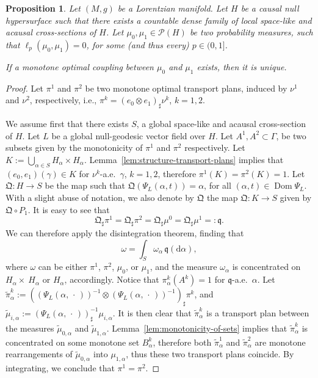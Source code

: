 \documentclass[12pt,a4paper]{amsart}
\theoremstyle{plain}
\newtheorem{proposition}[lemma]{Proposition}
\theoremstyle{definition}
\numberwithin{equation}{section}
\DeclareMathOperator{\dom}{Dom}
\newcommand{\de}{{\mathrm{d}}}
\newcommand{\Prob}{\mathcal P}
\newcommand{\dotargument}{\,\cdot\,}
\newcommand{\q}{\mathfrak{q}}
\newcommand{\QQ}{\mathfrak Q}
\newcommand{\gflow}{\Psi}
\begin{document}
\begin{proposition}
  \label{P:uniqueness-monotone}
Let $(M,g)$ be a Lorentzian manifold.
  Let $H$ be a causal null hypersurface such that there exists a countable
  dense family of local
  space-like and acausal cross-sections of $H$. 
  Let $\mu_0,\mu_1\in \Prob(H)$ be two probability measures, such that
  $\ell_p(\mu_0,\mu_1)=0$,  for some (and thus every) $p\in (0,1]$.

  If a monotone optimal coupling between $\mu_0$ and $\mu_1$
  exists, then it is unique.
\end{proposition}
\begin{proof}
  Let $\pi^1$ and $\pi^2$ be two monotone optimal transport plans, induced by
  $\nu^1$ and $\nu^2$, respectively, i.e., $\pi^k=(e_0\otimes
  e_1)_{\sharp} \nu^k$, $k=1,2$.

  We assume first that there exists $S$, a global space-like and
  acausal cross-section of $H$.
  Let $L$ be a global null-geodesic vector field over $H$.
  Let $A^1,A^2\subset\Gamma$, be two subsets given by the monotonicity
  of $\pi^1$ and $\pi^2$ respectively.
  Let $K:=\bigcup_{\alpha\in S} H_\alpha\times H_\alpha$.
  Lemma~\ref{lem:structure-transport-plans} implies that
  $(e_0,e_1)(\gamma)\in K$ for $\nu^k$-a.e.\ $\gamma$, $k=1,2$,
  therefore $\pi^1(K)=\pi^2(K)=1$.
  Let $\QQ:H\to S$ be the map such that $\QQ(\gflow_L(\alpha,t))=\alpha$, for
  all $(\alpha,t)\in\dom \gflow_L$.
  With a slight abuse of notation, we also denote by $\QQ$ the map $\QQ:  K \to
  S$ given by $\QQ\circ P_1$.
  It is easy to see that
  \begin{equation}
    \QQ_{\sharp}\pi^1
    =
    \QQ_{\sharp}\pi^2
    =
    \QQ_{\sharp}\mu^0
    =
    \QQ_{\sharp}\mu^1
    =:
    \q
    .
  \end{equation}
  We can therefore apply the disintegration theorem, finding that
  \begin{equation}
    \omega
    =
    \int_S
    \omega_\alpha
    \,
    \q(\de\alpha)
    ,
  \end{equation}
  where $\omega$ can be either $\pi^1$, $\pi^2$, $\mu_0$, or $\mu_1$, and
  the measure $\omega_\alpha$ is concentrated on $H_\alpha\times\
  H_\alpha$ or $H_\alpha$, accordingly.
  Notice that $\pi^k_\alpha(A^k)=1$ for $\q$-a.e.\ $\alpha$.
%
  Let
  $\tilde\pi^k_\alpha:=((\gflow_L(\alpha,\dotargument))^{-1}\otimes
  (\gflow_L(\alpha,\dotargument))^{-1})_{\sharp}\pi^k$, and
  $\tilde\mu_{i,\alpha}:=(\gflow_L(\alpha,\dotargument))^{-1}_{\sharp}
  \mu_{i,\alpha}$.
  It is then clear that $\tilde\pi^k_\alpha$ is a transport plan
  between the measures $\tilde\mu_{0,\alpha}$ and
  $\tilde\mu_{1,\alpha}$.
  Lemma~\ref{lem:monotonicity-of-sets} implies that
  $\tilde\pi^k_\alpha$ is concentrated on some monotone set
  $B_\alpha^k$, therefore both $\tilde\pi_\alpha^1$ and
  $\tilde\pi_\alpha^2$ are monotone rearrangements of
  $\tilde\mu_{0,\alpha}$ into $\mu_{1,\alpha}$, thus these two
  transport plans coincide.
  By integrating, we conclude that $\pi^1=\pi^2$.



\end{proof}
\end{document}

